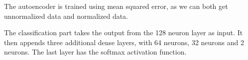 The autoencoder is trained using mean squared error, as we can both get unnormalized data and normalized data.

The classification part takes the output from the 128 neuron layer as input.
It then appends three additional dense layers, with 64 neurons, 32 neurons and 2 neurons.
The last layer has the softmax activation function.

